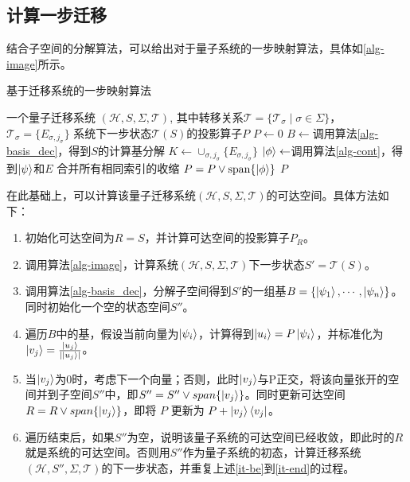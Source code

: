 \subsection*{计算一步迁移}
结合子空间的分解算法，可以给出对于量子系统的一步映射算法，具体如\ref{alg-image}所示。
\begin{algorithm}
\caption{基于迁移系统的一步映射算法}
\label{alg-image}
\begin{algorithmic}[1] %
\Require 一个量子迁移系统 $(\mathcal{H},S,\Sigma,\mathcal{T})$, 其中转移关系$\mathcal{T}=\{\mathcal{T}_\sigma\mid \sigma\in \Sigma\}$，  $\mathcal{T}_\sigma=\{E_{\sigma,j_\sigma}\}$
\Ensure 系统下一步状态$\mathcal{T}(S)$的投影算子$P$
\State $P \gets 0$ 
\State $B \gets $调用算法\ref{alg-basis_dec}，得到$S$的计算基分解
\State $K \gets \cup_{\sigma,j_\sigma}\{E_{\sigma,j_\sigma}\}$
    \State $\ket{\phi} \gets $调用算法\ref{alg-cont}，得到\(\ket{\psi}\)和\(E\) 合并所有相同索引的收缩
    \State $P=P \vee \text{span}\{\ket{\phi}\}$
\EndFor
\State \Return $P$ 
\end{algorithmic}
\end{algorithm}

在此基础上，可以计算该量子迁移系统$(\mathcal{H},S,\Sigma,\mathcal{T})$的可达空间。具体方法如下：
\begin{enumerate}
    \item 初始化可达空间为\(R = S\)，并计算可达空间的投影算子\(P_{R}\)。
    \item 调用算法\ref{alg-image}，计算系统$(\mathcal{H},S,\Sigma,\mathcal{T})$下一步状态\(S'=\mathcal{T}(S)\)。
    \item \label{it-be}调用算法\ref{alg-basis_dec}，分解子空间得到\(S'\)的一组基\(B = \{\ket{\psi_{1}},\cdots,\ket{\psi_{n}}\}\)。同时初始化一个空的状态空间$S''$。
    \item 遍历\(B\)中的基，假设当前向量为\(\ket{\psi_{i}}\)，计算得到\(\ket{u_i}=P\ket{\psi_{i}}\)，并标准化为$\ket{v_j}=\frac{\ket{u_j}}{|\ket{u_j}|}$。
    \item \label{it-end}当$\ket{v_j}$为0时，考虑下一个向量；否则，此时$\ket{v_j}$与P正交，将该向量张开的空间并到子空间$S''$中，即$S''=S''\vee span\{\ket{v_j}\}$。同时更新可达空间$R=R\vee span\{\ket{v_j}\}$，即将 $P$ 更新为 $P+\ket{v_j}\bra{v_j}$。
    \item 遍历结束后，如果$S''$为空，说明该量子系统的可达空间已经收敛，即此时的$R$就是系统的可达空间。否则用$S''$作为量子系统的初态，计算迁移系统$(\mathcal{H},S'',\Sigma,\mathcal{T})$的下一步状态，并重复上述\ref{it-be}到\ref{it-end}的过程。
\end{enumerate}

